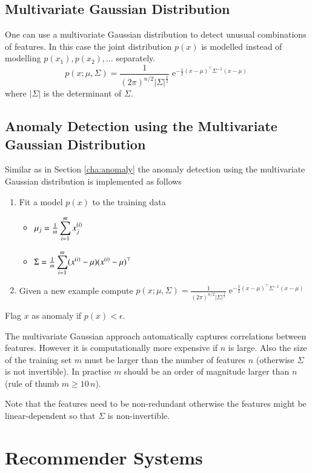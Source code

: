 \documentclass[a4paper,twoside,10pt]{article}
\begin{document}
\subsection{Multivariate Gaussian Distribution}
One can use a multivariate Gaussian distribution to detect unusual combinations of features.
In this case the joint distribution $p(x)$ is modelled instead of modelling $p(x_1),p(x_2),\ldots$ separately.
\begin{equation*}
  p(x;\mu,\Sigma)=\frac{1}{(2\pi)^{n/2}|\Sigma|^\frac{1}{2}}\operatorname{e}^{-\frac{1}{2}(x-\mu)^\top\Sigma^{-1}(x-\mu)}
\end{equation*}
where $|\Sigma|$ is the determinant of $\Sigma$.

\subsection{Anomaly Detection using the Multivariate Gaussian Distribution}
Similar as in Section \ref{cha:anomaly} the anomaly detection using the multivariate Gaussian distribution is implemented as follows
\begin{enumerate}
  \item Fit a model $p(x)$ to the training data
  \begin{itemize}
    \item $\mu_j=\frac{1}{m}\displaystyle\sum_{i=1}^mx^{(i)}_j$
    \item $\Sigma=\frac{1}{m}\displaystyle\sum_{i=1}^m(x^{(i)}-\mu)(x^{(i)}-\mu)^\top$
  \end{itemize}
  \item Given a new example compute
    $p(x;\mu,\Sigma)=\displaystyle\frac{1}{(2\pi)^{n/2}|\Sigma|^\frac{1}{2}}\operatorname{e}^{-\frac{1}{2}(x-\mu)^\top\Sigma^{-1}(x-\mu)}$
\end{enumerate}
Flag $x$ as anomaly if $p(x)<\epsilon$.

The multivariate Gaussian approach automatically captures correlations between features.
However it is computationally more expensive if $n$ is large.
Also the size of the training set $m$ must be larger than the number of features $n$ (otherwise $\Sigma$ is not invertible).
In practise $m$ should be an order of magnitude larger than $n$ (rule of thumb $m\ge 10\,n$).

Note that the features need to be non-redundant otherwise the features might be linear-dependent so that $\Sigma$ is non-invertible.

\section{Recommender Systems}
\end{document}
